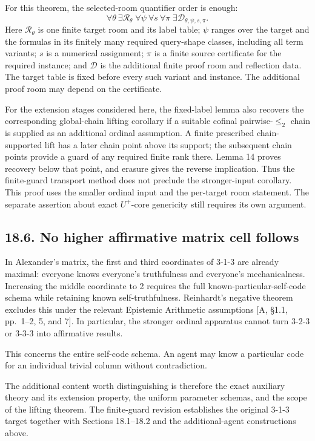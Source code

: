 \documentclass[
  11pt,
  letterpaper,
]{article}
\begin{document}
For this theorem, the selected-room quantifier order is enough: \[
\forall\theta\ \exists\mathscr R_\theta\;
\forall\psi\ \forall s\ \forall\pi\;
\exists\mathscr D_{\theta,\psi,s,\pi}.
\tag{P6}
\] Here \(\mathscr R_\theta\) is one finite target room and its label
table; \(\psi\) ranges over the target and the formulas in its finitely
many required query-shape classes, including all term variants; \(s\) is
a numerical assignment; \(\pi\) is a finite source certificate for the
required instance; and \(\mathscr D\) is the additional finite proof
room and reflection data. The target table is fixed before every such
variant and instance. The additional proof room may depend on the
certificate.

For the extension stages considered here, the fixed-label lemma also
recovers the corresponding global-chain lifting corollary if a suitable
cofinal pairwise-\(\leq_2\) chain is supplied as an additional ordinal
assumption. A finite prescribed chain-supported lift has a later chain
point above its support; the subsequent chain points provide a guard of
any required finite rank there. Lemma 14 proves recovery below that
point, and erasure gives the reverse implication. Thus the finite-guard
transport method does not preclude the stronger-input corollary. This
proof uses the smaller ordinal input and the per-target room statement.
The separate assertion about exact \(U^+\)-core genericity still
requires its own argument.

\subsection{18.6. No higher affirmative matrix cell
follows}\label{no-higher-affirmative-matrix-cell-follows}

In Alexander's matrix, the first and third coordinates of 3-1-3 are
already maximal: everyone knows everyone's truthfulness and everyone's
mechanicalness. Increasing the middle coordinate to 2 requires the full
known-particular-self-code schema while retaining known
self-truthfulness. Reinhardt's negative theorem excludes this under the
relevant Epistemic Arithmetic assumptions {[}A, §1.1, pp.~1--2, 5, and
7{]}. In particular, the stronger ordinal apparatus cannot turn 3-2-3 or
3-3-3 into affirmative results.

This concerns the entire self-code schema. An agent may know a
particular code for an individual trivial column without contradiction.

The additional content worth distinguishing is therefore the exact
auxiliary theory and its extension property, the uniform parameter
schemas, and the scope of the lifting theorem. The finite-guard revision
establishes the original 3-1-3 target together with Sections 18.1--18.2
and the additional-agent constructions above.
\end{document}
